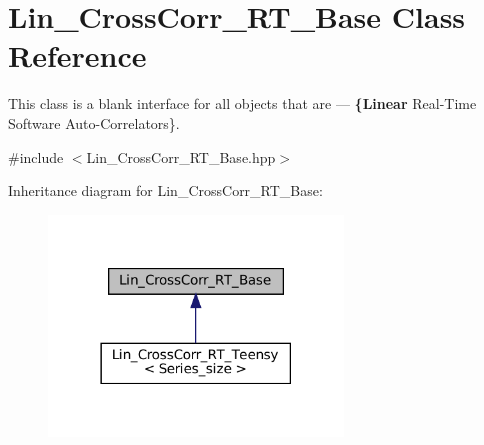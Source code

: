 \hypertarget{classLin__CrossCorr__RT__Base}{}\section{Lin\+\_\+\+Cross\+Corr\+\_\+\+R\+T\+\_\+\+Base Class Reference}
\label{classLin__CrossCorr__RT__Base}


This class is a blank interface for all objects that are — {\bfseries \{Linear} Real-\/\+Time Software Auto-\/\+Correlators\}.  




{\ttfamily \#include $<$Lin\+\_\+\+Cross\+Corr\+\_\+\+R\+T\+\_\+\+Base.\+hpp$>$}



Inheritance diagram for Lin\+\_\+\+Cross\+Corr\+\_\+\+R\+T\+\_\+\+Base\+:
\nopagebreak
\begin{figure}[H]
\begin{center}
\leavevmode
\includegraphics[width=222pt]{classLin__CrossCorr__RT__Base__inherit__graph}
\end{center}
\end{figure}
